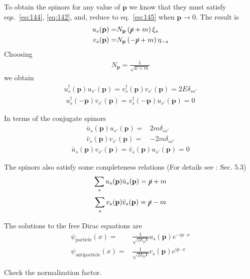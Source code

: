 To obtain the spinors for any value of $\mathbf{p}$ we know that they must satisfy eqs.~\eqref{eq:144}, \eqref{eq:142}, and, reduce to eq.~\eqref{eq:145} when $\mathbf{p}\to 0$. 
The result is
\begin{align}
  u_s(\mathbf{p})=&N_{\mathbf{p}}\left(\cancel{p}+m\right)\xi_s\nonumber\\
  v_s(\mathbf{p})=&N_{\mathbf{p}}\left(-\cancel{p}+m\right)\eta_{-s}
\end{align}
Choosing
\begin{align}
  N_{\mathbf{p}}=\frac{1}{\sqrt{E+m}}
\end{align}
we obtain
\begin{align}
  u_s^\dagger(\mathbf{p})u_{s'}(\mathbf{p})=v_s^\dagger(\mathbf{p})v_{s'}(\mathbf{p})=2E \delta_{s s'}
\end{align}
\begin{align}
  u_s^\dagger(-\mathbf{p})v_{s'}(\mathbf{p})=v_s^\dagger(-\mathbf{p})u_{s'}(\mathbf{p})=0
\end{align}

In terms of the conjugate spinors
\begin{align}
  \bar{u}_s(\mathbf{p})u_{s'}(\mathbf{p})=&2m \delta_{s s'}\nonumber\\
  \bar{v}_s(\mathbf{p})v_{s'}(\mathbf{p})=&-2m \delta_{s s'}
\end{align}
\begin{align}
  \bar{u}_s(\mathbf{p})v_{s'}(\mathbf{p})=\bar{v}_s(\mathbf{p})u_{s'}(\mathbf{p})=0
\end{align}


The spinors also satisfy some completeness relations (For details see \cite{Pal:2007dc}: Sec. 5.3)
\begin{align}
  \sum_s u_s(\mathbf{p})\bar{u}_s(\mathbf{p})=\cancel{p}+m
\end{align}
\begin{align}
  \sum_s v_s(\mathbf{p})\bar{v}_s(\mathbf{p})=\cancel{p}-m
\end{align}

The solutions to the free Dirac equations are
\begin{align}
  \psi_{\text{particle}}(x)=&\frac{1}{\sqrt{2E_p V}}u_s(\mathbf{p})e^{-i p\cdot x}\nonumber\\
  \psi_{\text{antiparticle}}(x)=&\frac{1}{\sqrt{2E_p V}}v_s(\mathbf{p})e^{i p\cdot x}
\end{align}
\begin{inprogress}
  Check the normalization factor.
\end{inprogress}

